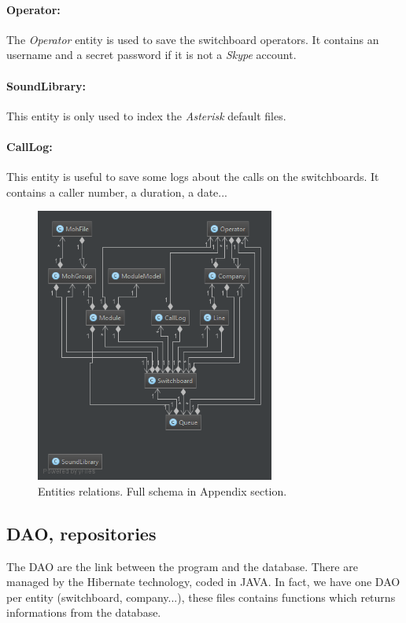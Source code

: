 \paragraph{Operator:}
The \textit{Operator} entity is used to save the switchboard operators. It contains an username and a secret password if it is not a \textit{Skype} account.

\paragraph{SoundLibrary:}
This entity is only used to index the \textit{Asterisk} default files.

\paragraph{CallLog:}
This entity is useful to save some logs about the calls on the switchboards. It contains a caller number, a duration, a date... 

\begin{figure}[H]
  \caption{Entities relations.
  Full schema in Appendix section.}
  \centering
    \includegraphics[width=0.7\textwidth]{img/modelsSimple.png}
\end{figure}

\subsection{DAO, repositories}


The DAO are the link between the program and the database. There are managed by the Hibernate technology, coded in JAVA.
In fact, we have one DAO per entity (switchboard, company...), these files contains functions which returns informations from the database.









